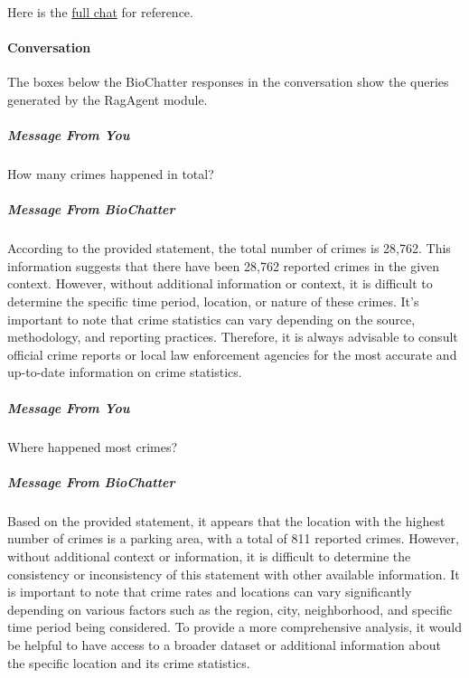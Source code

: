 Here is the \href{https://chat.openai.com/share/8e3b8ed6-c8a2-4460-a1ad-fe637e4c3db1}{full
chat} for
reference.

\hypertarget{conversation}{%
\paragraph{Conversation}\label{conversation}}

The boxes below the BioChatter responses in the conversation show the queries
generated by the RagAgent module.

\hypertarget{message-from-you}{%
\subparagraph{Message From You}\label{message-from-you}}

How many crimes happened in total?

\hypertarget{message-from-biochatter}{%
\subparagraph{Message From BioChatter}\label{message-from-biochatter}}

According to the provided statement, the total number of crimes is 28,762. This information suggests that there have been 28,762 reported crimes in the given context. However, without additional information or context, it is difficult to determine the specific time period, location, or nature of these crimes. It's important to note that crime statistics can vary depending on the source, methodology, and reporting practices. Therefore, it is always advisable to consult official crime reports or local law enforcement agencies for the most accurate and up-to-date information on crime statistics.

\begin{Shaded}
\begin{Highlighting}[]
\end{Highlighting}
\end{Shaded}

\hypertarget{message-from-you-1}{%
\subparagraph{Message From You}\label{message-from-you-1}}

Where happened most crimes?

\hypertarget{message-from-biochatter-1}{%
\subparagraph{Message From BioChatter}\label{message-from-biochatter-1}}

Based on the provided statement, it appears that the location with the highest number of crimes is a parking area, with a total of 811 reported crimes. However, without additional context or information, it is difficult to determine the consistency or inconsistency of this statement with other available information. It is important to note that crime rates and locations can vary significantly depending on various factors such as the region, city, neighborhood, and specific time period being considered. To provide a more comprehensive analysis, it would be helpful to have access to a broader dataset or additional information about the specific location and its crime statistics.

